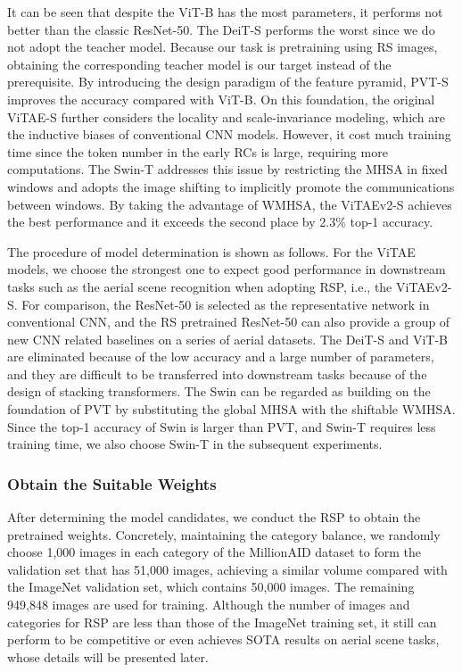 \documentclass[10pt, journal,twoside]{IEEEtran}
\begin{document}
It can be seen that despite the ViT-B has the most parameters, it performs not better than the classic ResNet-50. The DeiT-S performs the worst since we do not adopt the teacher model. Because our task is pretraining using RS images, obtaining the corresponding teacher model is our target instead of the prerequisite. By introducing the design paradigm of the feature pyramid, PVT-S improves the accuracy compared with ViT-B. On this foundation, the original ViTAE-S further considers the locality and scale-invariance modeling, which are the inductive biases of conventional CNN models. However, it cost much training time since the token number in the early RCs is large, requiring more computations. The Swin-T addresses this issue by restricting the MHSA in fixed windows and adopts the image shifting to implicitly promote the communications between windows. By taking the advantage of WMHSA, the ViTAEv2-S achieves the best performance and it exceeds the second place by 2.3\% top-1 accuracy.

The procedure of model determination is shown as follows. For the ViTAE models, we choose the strongest one to expect good performance in downstream tasks such as the aerial scene recognition when adopting RSP, i.e., the ViTAEv2-S. For comparison, the ResNet-50 is selected as the representative network in conventional CNN, and the RS pretrained ResNet-50 can also provide a group of new CNN related baselines on a series of aerial datasets. The DeiT-S and ViT-B are eliminated because of the low accuracy and a large number of parameters, and they are difficult to be transferred into downstream tasks because of the design of stacking transformers. The Swin can be regarded as building on the foundation of PVT by substituting the global MHSA with the shiftable WMHSA. Since the top-1 accuracy of Swin is larger than PVT, and Swin-T requires less training time, we also choose Swin-T in the subsequent experiments.

\subsubsection{Obtain the Suitable Weights}

After determining the model candidates, we conduct the RSP to obtain the pretrained weights. Concretely, maintaining the category balance, we randomly choose 1,000 images in each category of the MillionAID dataset to form the validation set that has 51,000 images, achieving a similar volume compared with the ImageNet validation set, which contains 50,000 images. The remaining 949,848 images are used for training. Although the number of images and categories for RSP are less than those of the ImageNet training set, it still can perform to be competitive or even achieves SOTA results on aerial scene tasks, whose details will be presented later.
\end{document}
